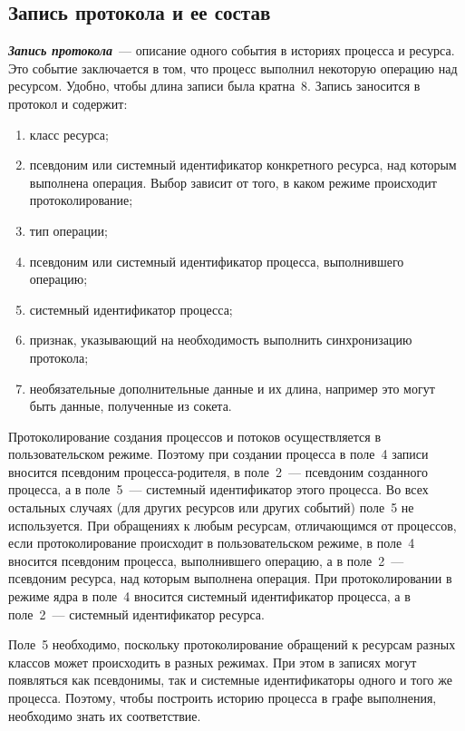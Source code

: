 \begin{multicols}{2}
\subsection*{Запись протокола и ее состав}

{\bfseries\textit{Запись протокола}}~--- описание одного события в историях процесса и
ресурса. Это  событие  заключается в том, что процесс выполнил некоторую
операцию над ресурсом. Удобно, чтобы длина записи была кратна~8. Запись
заносится в протокол и содержит:
\begin{enumerate}[(1)]
\item класс ресурса;
\item псевдоним или системный идентификатор конкретного ресурса, над
которым выполнена операция. Выбор зависит от того, в каком режиме
происходит протоколирование;
\item тип операции;
\item псевдоним или системный идентификатор процесса, выполнившего
операцию;
\item системный идентификатор процесса;
\item признак, указывающий на необходимость выполнить синхронизацию
протокола;
\item необязательные дополнительные данные и их длина, например это
могут быть данные, полученные из сокета.
\end{enumerate}

Протоколирование создания процессов и потоков осуществляется в пользовательском 
режиме. Поэтому при создании процесса в по\-ле~4 записи вносится псевдоним 
процесса-родителя, в поле~2~--- псевдоним созданного процесса, а в поле~5~--- 
сис\-тем\-ный идентификатор этого процесса. Во всех остальных случаях (для 
других ресурсов или других событий) поле~5 не используется. При обращениях к 
любым ресурсам, отличающимся от процессов, если протоколирование происходит в 
пользовательском режиме, в поле~4 вносится псевдоним процесса, выполнившего 
операцию, а в поле~2~--- псевдоним ресурса, над которым выполнена операция.  
При протоколировании в режиме ядра в поле~4 вносится сис\-тем\-ный 
идентификатор процесса, а в поле~2~--- системный идентификатор ресурса.

Поле~5 необходимо, поскольку протоколирование обращений к ресурсам
разных классов может происходить в разных режимах. При этом в записях
могут появляться как псевдонимы, так и системные идентификаторы одного и
того же процесса. Поэтому, чтобы построить историю процесса в графе
выполнения, необходимо знать их соответствие.


\end{multicols}
